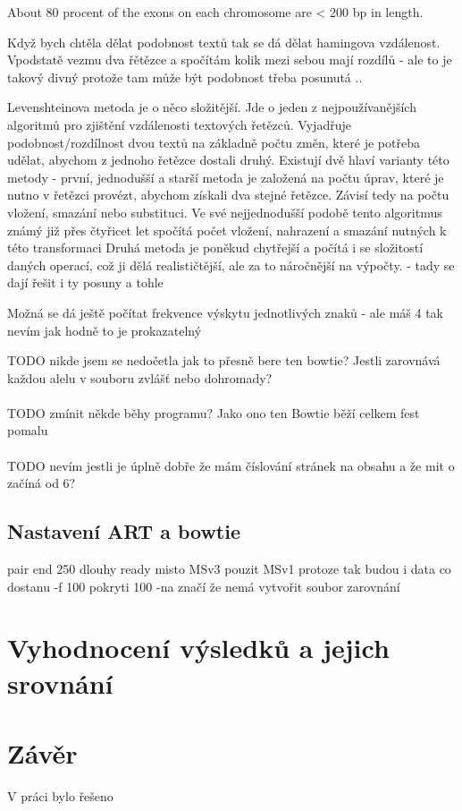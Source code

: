 \documentclass[czech,DP]{thesiskiv}
\numberwithin{equation}{section}
\begin{document}
About 80 procent of the exons on each chromosome are < 200 bp in length.

Když bych chtěla dělat podobnost textů tak se dá dělat hamingova vzdálenost. Vpodstatě vezmu dva řětězce a spočítám kolik mezi sebou mají rozdílů
- ale to je takový divný protože tam může být podobnost třeba posunutá ..

Levenshteinova metoda je o něco složitější. Jde o jeden z nejpoužívanějších algoritmů
pro zjištění vzdálenosti textových řetězců. Vyjadřuje podobnost/rozdílnost dvou textů na
základně počtu změn, které je potřeba udělat, abychom z jednoho řetězce dostali druhý.
Existují dvě hlaví varianty této metody - první, jednodušší a starší metoda je založená
na počtu úprav, které je nutno v řetězci provézt, abychom získali dva stejné řetězce.
Závisí tedy na počtu vložení, smazání nebo substituci. Ve své nejjednodušší podobě tento
algoritmus známý již přes čtyřicet let spočítá počet vložení, nahrazení a smazání nutných
k této transformaci
Druhá metoda je poněkud chytřejší a počítá i se složitostí daných operací, což ji dělá
realističtější, ale za to náročnější na výpočty.
- tady se dají řešit i ty posuny a tohle

Možná se dá ještě počítat frekvence výskytu jednotlivých znaků - ale máš 4 tak nevím jak hodně to je prokazatelný

TODO nikde jsem se nedočetla jak to přesně bere ten bowtie? Jestli zarovnává každou alelu v souboru zvlášť nebo dohromady? 
\\
\\
TODO zmínit někde běhy programu? Jako ono ten Bowtie běží celkem fest pomalu
\\
\\
TODO nevím jestli je úplně dobře že mám číslování stránek na obsahu a že mit o začíná od 6?
\section{Nastavení ART a bowtie}

pair end
250 dlouhy ready
misto MSv3 pouzit MSv1 protoze tak budou i data co dostanu
-f 100 pokryti 100
-na značí že nemá vytvořit soubor zarovnání
\chapter{Vyhodnocení výsledků a jejich srovnání}
\chapter{Závěr}
V práci bylo řešeno 
\end{document}
